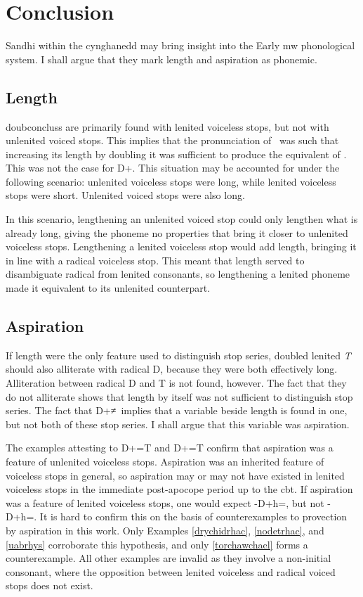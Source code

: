 \section{Conclusion}
Sandhi within the cynghanedd may bring insight into the Early \gls{mw} phonological system. I shall argue that they mark length and aspiration as phonemic. 

\subsection{Length}
\Gls{doubconclus}s are primarily found with lenited voiceless stops, but not with unlenited voiced stops. This implies that the pronunciation of \lT\ was such that increasing its length by doubling it was sufficient to produce the equivalent of \xT. This was not the case for \gls{D}+\xD. This situation may be accounted for under the following scenario: unlenited voiceless stops were long, while lenited voiceless stops were short. Unlenited voiced stops were also long. 

In this scenario, lengthening an unlenited voiced stop could only lengthen what is already long, giving the phoneme no properties that bring it closer to unlenited voiceless stops. Lengthening a lenited voiceless stop would add length, bringing it in line with a radical voiceless stop. This meant that length served to disambiguate radical from lenited consonants, so lengthening a lenited phoneme made it equivalent to its unlenited counterpart. 
\subsection{Aspiration}
If length were the only feature used to distinguish stop series, doubled lenited \textit{T} should also alliterate with radical \gls{D}, because they were both effectively long. Alliteration between radical \gls{D} and \gls{T} is not found, however. The fact that they do not alliterate shows that length by itself was not sufficient to distinguish stop series.  The fact that \gls{D}+\lT≠\xD\ implies that a variable beside length is found in one, but not both of these stop series. I shall argue that this variable was aspiration.

The examples attesting to \gls{D}+=\gls{T} and \gls{D}+=\gls{T} confirm that aspiration was a feature of unlenited voiceless stops. Aspiration was an inherited feature of voiceless stops in general, so aspiration may or may not have existed in lenited voiceless stops in the immediate post-apocope period up to the \gls{cbt}. If aspiration was a feature of lenited voiceless stops, one would expect -\gls{D}+h=\lT, but not -\gls{D}+h=\xD. It is hard to confirm this on the basis of counterexamples to provection by aspiration in this work. Only Examples \ref{drychidrhac}, \ref{nodetrhac}, and \ref{uabrhys} corroborate this hypothesis, and only \ref{torchawchael} forms a counterexample. All other examples are invalid as they involve a non-initial consonant, where the opposition between lenited voiceless and radical voiced stops does not exist. 

